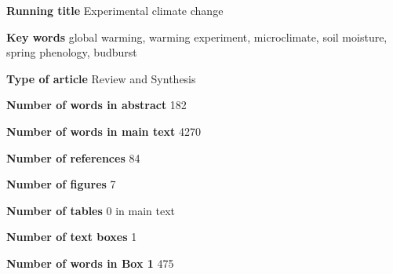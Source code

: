 \documentclass{article}
\begin{document}
\textbf{Running title} Experimental climate change

\textbf{Key words} global warming, warming experiment, microclimate, soil moisture, spring phenology, budburst

\textbf{Type of article} Review and Synthesis

\textbf{Number of words in abstract} 182

\textbf{Number of words in main text} 4270%

\textbf{Number of references} 84

\textbf{Number of figures} 7

\textbf{Number of tables} 0 in main text

\textbf{Number of text boxes} 1

\textbf{Number of words in Box 1} 475

\clearpage

\end{document}
